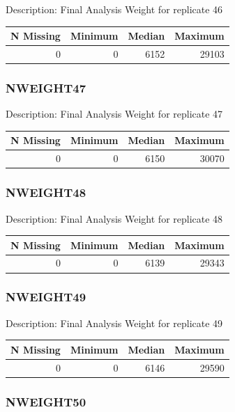 \documentclass[
]{krantz}
\begin{document}
Description: Final Analysis Weight for replicate 46

\begin{tabular}[t]{r|r|r|r}
\hline
N Missing & Minimum & Median & Maximum\\
\hline
0 & 0 & 6152 & 29103\\
\hline
\end{tabular}

\hypertarget{nweight47}{%
\subsubsection*{NWEIGHT47}\label{nweight47}}


Description: Final Analysis Weight for replicate 47

\begin{tabular}[t]{r|r|r|r}
\hline
N Missing & Minimum & Median & Maximum\\
\hline
0 & 0 & 6150 & 30070\\
\hline
\end{tabular}

\hypertarget{nweight48}{%
\subsubsection*{NWEIGHT48}\label{nweight48}}


Description: Final Analysis Weight for replicate 48

\begin{tabular}[t]{r|r|r|r}
\hline
N Missing & Minimum & Median & Maximum\\
\hline
0 & 0 & 6139 & 29343\\
\hline
\end{tabular}

\hypertarget{nweight49}{%
\subsubsection*{NWEIGHT49}\label{nweight49}}


Description: Final Analysis Weight for replicate 49

\begin{tabular}[t]{r|r|r|r}
\hline
N Missing & Minimum & Median & Maximum\\
\hline
0 & 0 & 6146 & 29590\\
\hline
\end{tabular}

\hypertarget{nweight50}{%
\subsubsection*{NWEIGHT50}\label{nweight50}}
\end{document}
